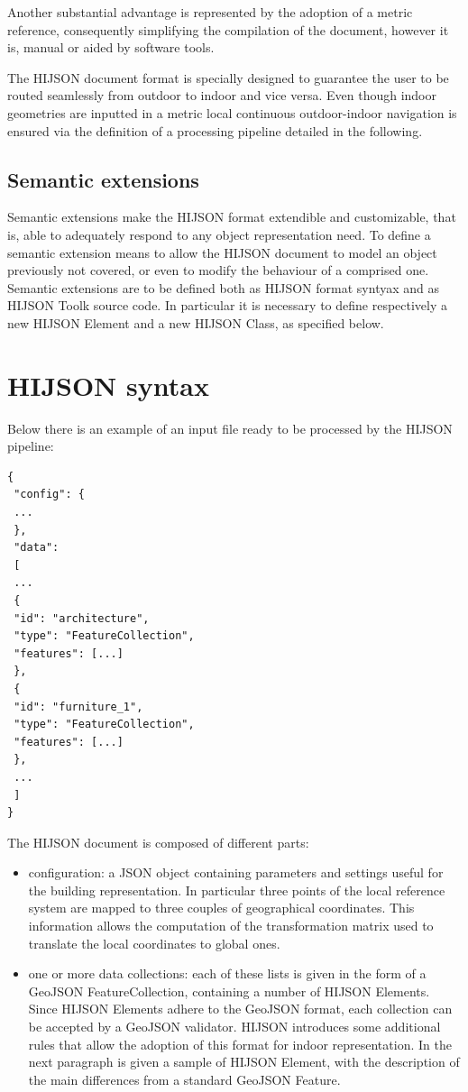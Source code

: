 \documentclass{sig-alternate}
\begin{document}
Another substantial advantage is represented by the adoption of a metric reference, 
consequently simplifying the compilation of the document, however it is, 
manual or aided by software tools.

The HIJSON document format is specially designed to guarantee the user to be routed seamlessly 
from outdoor to indoor and vice versa. Even though indoor geometries are inputted in a metric 
local continuous outdoor-indoor navigation is ensured via the definition of a processing pipeline
detailed in the following.

\subsection{Semantic extensions}\label{semantic-extensions}

Semantic extensions make the HIJSON format extendible and customizable, that
is, able to adequately respond to any object representation need. To define a
semantic extension means to allow the HIJSON document to model an object
previously not covered, or even to modify the behaviour of a comprised one.
Semantic extensions are to be defined both as HIJSON format syntyax and as
HIJSON Toolk source code. In particular it is necessary to define respectively
a new HIJSON Element and a new HIJSON Class, as specified below.


\section{HIJSON syntax}\label{hijson-syntax}

Below there is an example of an input file ready to be processed by the HIJSON pipeline:

\begin{verbatim}
{
 "config": {
 ...
 },
 "data": 
 [
 ...
 {
 "id": "architecture",
 "type": "FeatureCollection",
 "features": [...] 
 },
 {
 "id": "furniture_1",
 "type": "FeatureCollection",
 "features": [...] 
 },
 ...
 ]
}
\end{verbatim}

The HIJSON document is composed of different parts:

\begin{itemize}
\itemsep1pt\parskip0pt
\item 
 configuration: a JSON object containing parameters and settings useful
 for the building representation. In particular three points of the local
 reference system are mapped to three couples of geographical coordinates.
 This information allows the computation of the transformation matrix used to
 translate the local coordinates to global ones.
\item
 one or more data collections: each of these lists is given in the form of
 a GeoJSON FeatureCollection, containing a number of HIJSON Elements. Since
 HIJSON Elements adhere to the GeoJSON format, each collection can be
 accepted by a GeoJSON validator. HIJSON introduces some additional rules
 that allow the adoption of this format for indoor representation. In the
 next paragraph is given a sample of HIJSON Element, with the description of
 the main differences from a standard GeoJSON Feature. 
\end{itemize}
\end{document}
